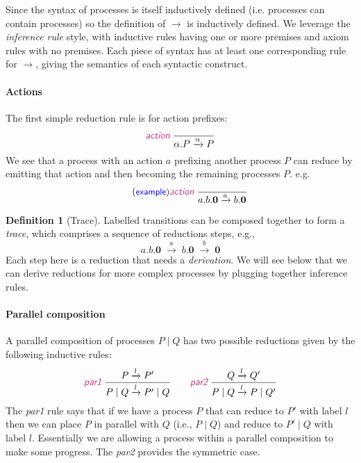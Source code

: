 \documentclass{article}
\newcommand{\exampleLabel}{\tag{\small{\textcolor{blue}{\textsf{example}}}}}
\theoremstyle{definition}
\newtheorem{definition}{Definition}
\newcommand{\trule}[1]{\textcolor{labelColor}{\textit{\textsf{#1}}}\;}
\begin{document}
Since the syntax of processes is itself inductively defined (i.e.
processes can contain processes) so the definition of $\rightarrow$ is
inductively defined. We leverage the \emph{inference rule} style, with
inductive rules having one or more premises and axiom rules with no
premises. Each piece of syntax has at least one corresponding rule for
$\rightarrow$, giving the semantics of each syntactic construct. 

\paragraph{Actions}

The first simple reduction rule is for action prefixes:
%
\begin{align*}
  \trule{action}\dfrac{}{\alpha.P \xrightarrow{\alpha} P}
\end{align*}
%
We see that a process with an action $a$ prefixing another process $P$ can reduce by
emitting that action and then becoming the remaining processes $P$.
e.g.
%
\begin{align*}
  \exampleLabel{}
  \trule{action}\dfrac{}{a.b.\mathbf{0} \xrightarrow{a} b.\mathbf{0}}
\end{align*}
%
\begin{definition}[Trace]
  Labelled transitions can be composed together to form a
  \emph{trace},
  which comprises a sequence of reductions steps, e.g.,
  \begin{equation*}
    a.b.\mathbf{0} \; \xrightarrow{a} \; b.\mathbf{0} \; \xrightarrow{b} \;\mathbf{0}
  \end{equation*}
  Each step here is a reduction that needs a \emph{derivation}. We
  will see below that we can derive reductions for more complex
  processes by plugging together inference rules.
\end{definition}

\paragraph{Parallel composition}
A parallel composition of processes $P \mid Q$ has two possible
reductions given by the following inductive rules:
%
\begin{align*}
  \trule{par1}{\dfrac{P \xrightarrow{l} P'}{P \mid Q \xrightarrow{l} P' \mid Q}}
\qquad
\trule{par2}{\dfrac{Q \xrightarrow{l} Q'}{P \mid Q \xrightarrow{l} P \mid Q'}}
\end{align*}
%
The \trule{par1} rule says that if we have a process $P$ that
can reduce to $P'$ with label $l$ then we can place $P$ in parallel
with $Q$ (i.e., $P \mid Q$) and reduce to $P' \mid Q$ with label $l$.
Essentially we are allowing a process within a parallel composition
to make some progress. The \trule{par2} provides the symmetric case.
\end{document}
